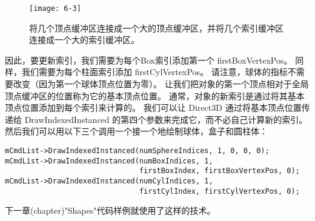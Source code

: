 \begin{flushleft}
\begin{figure}[h]
    \texttt{[image: 6-3]}
    \centering
    \caption{将几个顶点缓冲区连接成一个大的顶点缓冲区，并将几个索引缓冲区连接成一个大的索引缓冲区。}
    \label{fig:6-3}
\end{figure}

因此，要更新索引，我们需要为每个Box索引添加第一个 firstBoxVertexPos。 同样，我们需要为每个柱面索引添加 firstCylVertexPos。 请注意，球体的指标不需要改变（因为第一个球体顶点位置为零）。 让我们把对象的第一个顶点相对于全局顶点缓冲区的位置称为它的基本顶点位置。 通常，对象的新索引是通过将其基本顶点位置添加到每个索引来计算的。 我们可以让 Direct3D 通过将基本顶点位置传递给 DrawIndexedInstanced 的第四个参数来完成它，而不必自己计算新的索引。\\
然后我们可以用以下三个调用一个接一个地绘制球体，盒子和圆柱体：\\
\begin{lstlisting}
mCmdList->DrawIndexedInstanced(numSphereIndices, 1, 0, 0, 0);
mCmdList->DrawIndexedInstanced(numBoxIndices, 1, 
                               firstBoxIndex, firstBoxVertexPos, 0);
mCmdList->DrawIndexedInstanced(numCylIndices, 1, 
                               firstCylIndex, firstCylVertexPos, 0);
\end{lstlisting}
下一章(chapter)"Shapes"代码样例就使用了这样的技术。
\end{flushleft}

\clearpage
